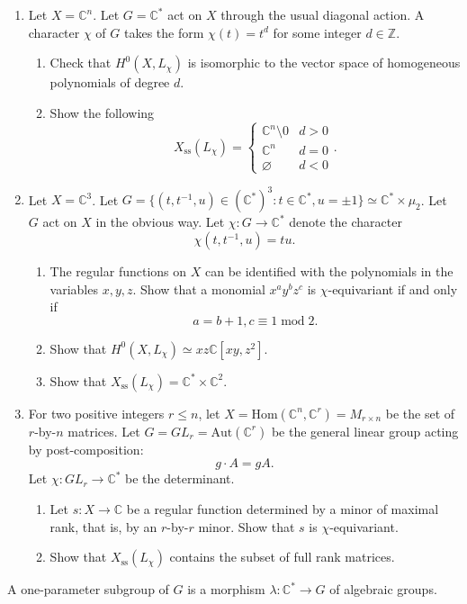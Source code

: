 \documentclass[12pt]{article}
\theoremstyle{definition}
\theoremstyle{theorem}
\begin{document}
\begin{enumerate}[label=\textbf{\arabic*.}]
\item Let $X = \mathbb{C}^n$. Let $G = \mathbb{C}^*$ act on $X$ through the usual diagonal action. A character $\chi$ of $G$ takes the form $\chi(t) = t^d$ for some integer $d \in \mathbb{Z}$. 
\begin{enumerate}
\item Check that $H^0(X, L_\chi)$ is isomorphic to the vector space of homogeneous polynomials of degree $d$. 
\item Show the following 
\[
X_{\text{ss}}(L_\chi) = \begin{cases}
\mathbb{C}^n \setminus 0 & d > 0 \\
\mathbb{C}^n & d = 0 \\
\varnothing & d < 0
\end{cases}.
\]
\end{enumerate}
\item Let $X = \mathbb{C}^3$. Let $G = \{(t,t^{-1},u) \in (\mathbb{C}^*)^3 : t \in \mathbb{C}^*, u = \pm 1\} \simeq \mathbb{C}^* \times \mu_2$. Let $G$ act on $X$ in the obvious way. Let $\chi : G \to \mathbb{C}^*$ denote the character 
\[
\chi(t,t^{-1}, u) = tu. 
\]
\begin{enumerate}
\item The regular functions on $X$ can be identified with the polynomials in the variables $x,y,z$. Show that a monomial $x^ay^bz^c$ is $\chi$-equivariant if and only if 
\[
a = b + 1, c \equiv 1 \; \text{mod}\; 2.
\]
\item Show that $H^0(X, L_\chi) \simeq xz\mathbb{C}[xy,z^2]$. 
\item Show that $X_{\text{ss}}(L_\chi) = \mathbb{C}^* \times \mathbb{C}^2$.
\end{enumerate}
\item For two positive integers $r \leqslant n$, let $X = \text{Hom}(\mathbb{C}^n, \mathbb{C}^r) = M_{r \times n}$ be the set of $r$-by-$n$ matrices. Let $G = GL_r = \text{Aut}(\mathbb{C}^r)$ be the general linear group acting by post-composition:
\[
g \cdot A = gA.
\]
Let $\chi : GL_r \to \mathbb{C}^*$ be the determinant. 
\begin{enumerate}
\item Let $s : X \to \mathbb{C}$ be a regular function determined by a minor of maximal rank, that is, by an $r$-by-$r$ minor. Show that $s$ is $\chi$-equivariant. 
\item Show that $X_{\text{ss}}(L_\chi)$ contains the subset of full rank matrices. 
\end{enumerate}
\end{enumerate}

\medskip

A one-parameter subgroup of $G$ is a morphism $\lambda : \mathbb{C}^* \to G$ of algebraic groups. 
\end{document}
